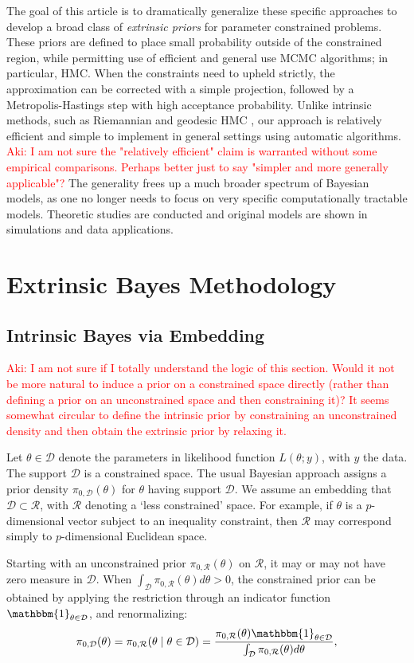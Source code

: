 \documentclass[10pt]{article}
\newcommand{\aki}[1]{\textcolor{red}{Aki: #1}}
\newcommand{\mc}[1]{\mathcal{#1}}
\DeclareMathOperator{\1}{\mathbbm{1}}
\begin{document}
The goal of this article is to dramatically generalize these specific approaches to develop a broad class of {\em extrinsic priors} for parameter constrained problems. These priors are defined to place small probability outside of the constrained region, while permitting use of efficient and general use MCMC algorithms; in particular, HMC. When the constraints need to upheld strictly, the approximation can be corrected with a simple projection, followed by a Metropolis-Hastings step with high acceptance probability.
Unlike intrinsic methods, such as Riemannian and geodesic HMC \citep{girolami2011riemann,byrne2013geodesic}, our approach is
relatively efficient and simple to implement in general settings using automatic algorithms. \aki{I am not sure the "relatively efficient" claim is warranted without some empirical comparisons. Perhaps better just to say "simpler and more generally applicable"?} The generality frees up a much broader spectrum of Bayesian models, as one no longer needs to focus on very specific computationally tractable models.
Theoretic studies are conducted and original models are shown in simulations and data applications.

\section{Extrinsic Bayes Methodology}
\subsection{Intrinsic Bayes via Embedding}
\aki{I am not sure if I totally understand the logic of this section. Would it not be more natural to induce a prior on a constrained space directly (rather than defining a prior on an unconstrained space and then constraining it)? It seems somewhat circular to define the intrinsic prior by constraining an unconstrained density and then obtain the extrinsic prior by relaxing it.}

Let $\theta \in \mc D$ denote the parameters in likelihood function $L(\theta;y)$, with $y$ the data. The support $\mc D$ is a constrained space. The usual Bayesian approach assigns a prior density $\pi_{0,\mc D}(\theta)$ for $\theta$ having support $\mc D$. We assume an embedding that $\mc D \subset \mc R$, with $\mc R$ denoting a `less constrained' space. For example, if $\theta$ is a $p$-dimensional vector subject to an inequality constraint, then $\mc R$ may correspond simply to $p$-dimensional Euclidean space.

Starting with an unconstrained prior $\pi_{0,\mc R}(\theta)$ on $\mc R$, it may or may not have zero measure in $\mc D$. When $ \int_{\mc D} \pi_{0,\mc R}(\theta)d\theta >0$, the constrained prior can be obtained by applying the restriction through an indicator function $\mathbbm{1}_{\theta\in \mc D}$, and renormalizing:
\begin{equation}
\begin{aligned}
\label{exact_prior1}
\pi_{0,\mc D}(\theta)= \pi_{0,\mc R}(\theta \mid \theta \in \mc D) = \frac{ \pi_{0,\mc R}(\theta) \mathbbm{1}_{\theta\in \mc D} }{ \int_{\mc D} \pi_{0,\mc R}(\theta)d\theta },
\end{aligned}
\end{equation}
\end{document}

